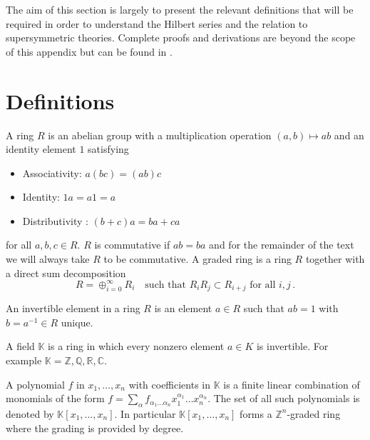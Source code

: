 \documentclass[main.tex]{subfiles}
\begin{document}
 
The aim of this section is largely to present the relevant definitions that will be required in order to understand the Hilbert series and the relation to supersymmetric theories. Complete proofs and derivations are beyond the scope of this appendix but can be found in \cite{eisenbud1995commutative}.
\section{Definitions}
\begin{definition}
\label{def:ring}
A ring $R$ is an abelian group with a multiplication operation $(a,b)\mapsto ab$ and an identity element $1$ satisfying
\begin{itemize}
\item Associativity: $a(bc)=(ab)c$
\item Identity: $1a=a1=a$
\item Distributivity : $(b+c)a=ba+ca$
\end{itemize}
for all $a,b,c\in R$. $R$ is commutative if $ab=ba$ and for the remainder of the text we will always take $R$ to be commutative.
A graded ring is a ring $R$ together with a direct sum decomposition
\begin{equation}
R=\oplus_{i=0}^{\infty} R_i \quad \text{such that $R_iR_j\subset R_{i+j}$ for all $i,j$}\,.
\end{equation}
\end{definition}
\begin{definition}
An invertible element in a ring $R$ is an element $a\in R$ such that $ab=1$ with $b=a^{-1}\in R$ unique.
\end{definition}
\begin{definition}[Fields]
A field $\mathbb{K}$ is a ring in which every nonzero element $a\in K$ is invertible. For example $\mathbb{K}=\mathbb{Z},\mathbb{Q},\mathbb{R},\mathbb{C}$.
\end{definition}
\begin{definition}[Polynomials]
A polynomial $f$ in $x_1,\dots,x_n$ with coefficients in $\mathbb{K}$ is a finite linear combination of monomials of the form $f=\sum_{\alpha}f_{\alpha_1\dots\alpha_n}x_1^{\alpha_1}\dots x_n^{\alpha_n}$. The set of all such polynomials is denoted by $\mathbb{K}[x_1,\dots,x_n]$. In particular $\mathbb{K}[x_1,\dots,x_n]$ forms a $\mathbb{Z}^{n}$-graded ring where the grading is provided by degree.
\end{definition}
\end{document}
